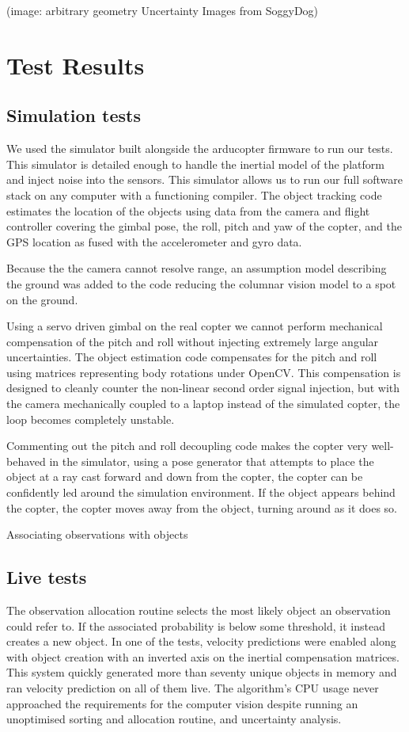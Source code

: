 \documentclass[a4paper, 11pt, titlepage]{article}
\begin{document}
        (image: arbitrary geometry Uncertainty Images from SoggyDog)

      


\section{Test Results}

  \subsection{Simulation tests}
    We used the simulator built alongside the arducopter firmware to run our tests.  This simulator is detailed enough to handle the inertial model of the platform and inject noise into the sensors.
    This simulator allows us to run our full software stack on any computer with a functioning compiler.
    The object tracking code estimates the location of the objects using data from the camera and flight controller covering the gimbal pose, the roll, pitch and yaw of the copter, and the GPS location as fused with the accelerometer and gyro data.

    Because the the camera cannot resolve range, an assumption model describing the ground was added to the code reducing the columnar vision model to a spot on the ground.

    Using a servo driven gimbal on the real copter we cannot perform mechanical compensation of the pitch and roll without injecting extremely large angular uncertainties.
    The object estimation code compensates for the pitch and roll using matrices representing body rotations under OpenCV.
    This compensation is designed to cleanly counter the non-linear second order signal injection, but with the camera mechanically coupled to a laptop instead of the simulated copter, the loop becomes completely unstable.

    Commenting out the pitch and roll decoupling code makes the copter very well-behaved in the simulator, using a pose generator that attempts to place the object at a ray cast forward and down from the copter, the copter can be confidently led around the simulation environment.  If the object appears behind the copter, the copter moves away from the object, turning around as it does so.

    Associating observations with objects 


  \subsection{Live tests}
    The observation allocation routine selects the most likely object an observation could refer to. If the associated probability is below some threshold, it instead creates a new object.
    In one of the tests, velocity predictions were enabled along with object creation with an inverted axis on the inertial compensation matrices. This system quickly generated more than seventy unique objects in memory and ran velocity prediction on all of them live. The algorithm's CPU usage never approached the requirements for the computer vision despite running an unoptimised sorting and allocation routine, and uncertainty analysis.
    
\end{document}
